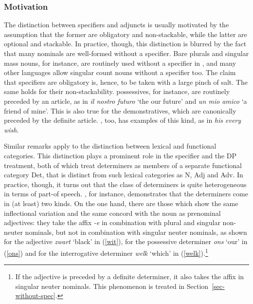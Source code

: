 \documentclass[output=paper,biblatex,babelshorthands,newtxmath,draftmode,colorlinks,citecolor=brown]{langscibook}
\begin{document}
\subsubsection{Motivation} 
\label{motiv}


The distinction between specifiers and adjuncts is usually motivated by 
the assumption that the former are obligatory and non-stackable, while the latter  
are optional and stackable. In practice, though, this distinction 
is blurred by the fact that many nominals are well-formed without a specifier.
Bare plurals and singular mass nouns, for instance, are routinely used without a 
specifier in , and many other languages allow singular count nouns without 
a specifier too. The claim that specifiers are obligatory is, hence, to be taken 
with a large pinch of salt. The same holds for their non-stackability. 
 possessives, for instance, are routinely preceded by an article, as in 
\emph{il nostro futuro} `the our future' and \emph{un mio amico} `a friend of mine'.     
This is also true for the  demonstratives, which are canonically preceded by the 
definite article. , too, has examples of this kind, as in \emph{his every wish}.    

Similar remarks apply to the distinction between lexical and functional categories. 
This distinction plays a prominent role in the specifier and the DP treatment, both of which treat 
determiners as members of a separate functional category Det, that is distinct from 
such lexical categories as N, Adj and Adv.
In practice, though, it turns out that the class of determiners is quite heterogeneous in 
terms of part-of speech. \citet{VanEynde06}, for instance, demonstrates that the 
 determiners come in (at least) two kinds. On the one hand, there are those 
which show the same inflectional variation and the same concord with the noun as 
prenominal adjectives: they take the affix \emph{-e} in combination with plural 
and singular non-neuter nominals, but not in combination with singular 
neuter nominals, as shown for the adjective \emph{zwart} `black' in (\ref{wit}), 
for the possessive determiner \emph{ons} `our' in (\ref{ons}) and for the 
interrogative determiner \emph{welk} `which' in (\ref{welk}).\footnote{If the adjective 
is preceded by a definite determiner, 
it also takes the affix in singular neuter nominals. This phenomenon is treated 
in Section~\ref{sec-without-spec}.} 
\end{document}
